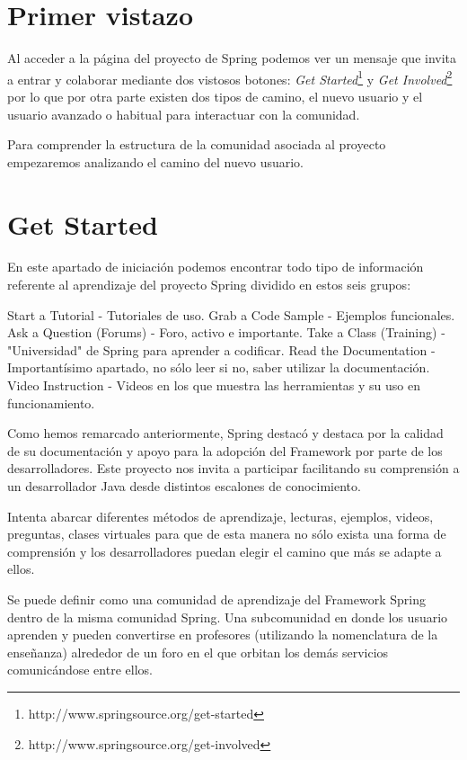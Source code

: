 \documentclass[11pt]{scrartcl}
\begin{document}
\section{Primer vistazo}

Al acceder a la página del proyecto de Spring podemos ver un mensaje que invita a entrar y colaborar mediante dos vistosos botones: \emph{Get Started}\footnote{http://www.springsource.org/get-started} y \emph{Get Involved}\footnote{http://www.springsource.org/get-involved} por lo que por otra parte existen dos tipos de camino, el nuevo usuario y el usuario avanzado o habitual para interactuar con la comunidad.

Para comprender la estructura de la comunidad asociada al proyecto empezaremos analizando el camino del nuevo usuario.

\section{Get Started}

En este apartado de iniciación podemos encontrar todo tipo de información referente al aprendizaje del proyecto Spring dividido en estos seis grupos:

    Start a Tutorial - Tutoriales de uso.
    Grab a Code Sample - Ejemplos funcionales.
    Ask a Question (Forums) - Foro, activo e importante.
    Take a Class (Training) - "Universidad" de Spring para aprender a codificar.
    Read the Documentation - Importantísimo apartado, no sólo leer si no, saber utilizar la documentación.
    Video Instruction - Videos en los que muestra las herramientas y su uso en funcionamiento.

Como hemos remarcado anteriormente, Spring destacó y destaca por la calidad de su documentación y apoyo para la adopción del Framework por parte de los desarrolladores.
Este proyecto nos invita a participar facilitando su comprensión a un desarrollador Java desde distintos escalones de conocimiento.

Intenta abarcar diferentes métodos de aprendizaje, lecturas, ejemplos, videos, preguntas, clases virtuales para que de esta manera no sólo exista una forma de comprensión y los desarrolladores puedan elegir el camino que más se adapte a ellos.

Se puede definir como una comunidad de aprendizaje del Framework Spring dentro de la misma comunidad Spring. Una subcomunidad en donde los usuario aprenden y pueden convertirse en profesores (utilizando la nomenclatura de la enseñanza) alrededor de un foro en el que orbitan los demás servicios comunicándose entre ellos.
\end{document}
